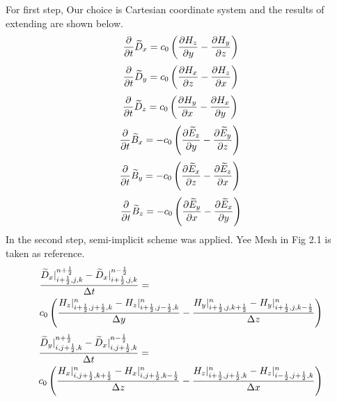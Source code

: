 For first step, Our choice is Cartesian coordinate system and the results of extending are shown below.
\begin{equation}
  \frac{\partial}{\partial t} \widetilde{D}_x = c_0 \left( \frac{\partial H_z}{\partial y} - \frac{\partial H_y}{\partial z} \right) \label{eq:up_d_x}
\end{equation}
\begin{equation}
  \frac{\partial}{\partial t} \widetilde{D}_y = c_0 \left( \frac{\partial H_x}{\partial z} - \frac{\partial H_z}{\partial x} \right) \label{eq:up_d_y}  
\end{equation}
\begin{equation}
  \frac{\partial}{\partial t} \widetilde{D}_z = c_0 \left( \frac{\partial H_y}{\partial x} - \frac{\partial H_x}{\partial y} \right) \label{eq:up_d_z}\\  
\end{equation}
\begin{equation}
  \frac{\partial}{\partial t} \widetilde{B}_x =-c_0 \left(\frac{\partial \widetilde{E}_z}{\partial y} - \frac{\partial \widetilde{E}_y}{\partial z}\right) \label{eq:up_b_x}\\  
\end{equation}
\begin{equation}
  \frac{\partial}{\partial t} \widetilde{B}_y =-c_0 \left(\frac{\partial \widetilde{E}_x}{\partial z} - \frac{\partial \widetilde{E}_z}{\partial x}\right) \label{eq:up_b_y}\\  
\end{equation}
\begin{equation}
  \frac{\partial}{\partial t} \widetilde{B}_z =-c_0 \left(\frac{\partial \widetilde{E}_y}{\partial x} - \frac{\partial \widetilde{E}_x}{\partial y}\right) \label{eq:up_b_z}
\end{equation}
In the second step, semi-implicit scheme was applied. Yee Mesh in Fig 2.1 is taken as reference.
\begin{equation}
  \begin{split}
    \displaystyle & \frac{\widetilde{D}_x|_{i+\frac{1}{2},j,k}^{n+\frac{1}{2}} - \widetilde{D}_x|_{i+\frac{1}{2},j,k}^{n-\frac{1}{2}}}{\Delta t} = \\
    \displaystyle & c_0\left(\frac{H_z|_{i+\frac{1}{2},j+\frac{1}{2},k}^{n} - H_z|_{i+\frac{1}{2},j-\frac{1}{2},k}^{n}}{\Delta y} - \frac{H_y|_{i+\frac{1}{2},j,k+\frac{1}{2}}^{n} - H_y|_{i+\frac{1}{2},j,k-\frac{1}{2}}^{n}}{\Delta z}\right)\\
  \end{split}
\end{equation}
\begin{equation}
  \begin{split}
    \displaystyle & \frac{\widetilde{D}_y|_{i,j+\frac{1}{2},k}^{n+\frac{1}{2}} - \widetilde{D}_x|_{i,j+\frac{1}{2},k}^{n-\frac{1}{2}}}{\Delta t} = \\
    \displaystyle & c_0\left(\frac{H_x|_{i,j+\frac{1}{2},k+\frac{1}{2}}^{n} - H_x|_{i,j+\frac{1}{2},k-\frac{1}{2}}^{n}}{\Delta z} - \frac{H_z|_{i+\frac{1}{2},j+\frac{1}{2},k}^{n} - H_z|_{i-\frac{1}{2},j+\frac{1}{2},k}^{n}}{\Delta x}\right)\\
  \end{split}
\end{equation}
